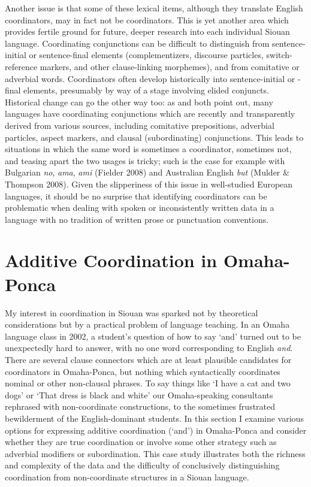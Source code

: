 \documentclass[output=paper]{LSP/langsci}
\begin{document}
Another issue is that some of these lexical items, although they translate English coordinators, may in fact not be coordinators. This is yet another area which provides fertile ground for future, deeper research into each individual Siouan language. Coordinating conjunctions can be difficult to distinguish from sentence-initial or sentence-final elements (complementizers, discourse particles, switch-reference markers, and other clause-linking morphemes), and from comitative or adverbial words. Coordinators often develop historically into sentence-initial or -final elements, presumably by way of a stage involving elided conjuncts. Historical change can go the other way too: as \citet{Mithun1988} and \citet{Stassen2000} both point out, many languages have coordinating conjunctions which are recently and transparently derived from various sources, including comitative prepositions, adverbial particles, aspect markers, and clausal (subordinating) conjunctions. This leads to situations in which the same word is sometimes a coordinator, sometimes not, and teasing apart the two usages is tricky; such is the case for example with Bulgarian \textit{no}, \textit{ama}, \textit{ami} (Fielder 2008) and Australian English \textit{but} (Mulder \& Thompson 2008). Given the slipperiness of this issue in well-studied European languages, it should be no surprise that identifying coordinators can be problematic when dealing with spoken or inconsistently written data in a language with no tradition of written prose or punctuation conventions.

\section{Additive Coordination in Omaha-Ponca}

My interest in coordination in Siouan was sparked not by theoretical considerations but by a practical problem of language teaching. In an Omaha language class in 2002, a student's question of how to say `and' turned out to be unexpectedly hard to answer, with no one word corresponding to English \textit{and}. There are several clause connectors which are at least plausible candidates for coordinators in Omaha-Ponca, but nothing which syntactically coordinates nominal or other non-clausal phrases. To say things like `I have a cat and two dogs' or `That dress is black and white' our Omaha-speaking consultants rephrased with non-coordinate constructions, to the sometimes frustrated bewilderment of the English-dominant students.  In this section I examine various options for expressing additive coordination (`and') in Omaha-Ponca and consider whether they are true coordination or involve some other strategy such as adverbial modifiers or subordination. This case study illustrates both the richness and complexity of the data and the difficulty of conclusively distinguishing coordination from non-coordinate structures in a Siouan language.
\end{document}
